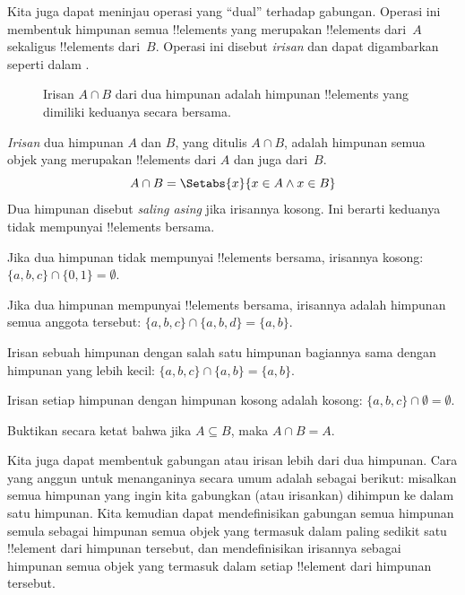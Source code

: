 \documentclass[../../../include/open-logic-section]{subfiles}
\begin{document}
\begin{explain}
Kita juga dapat meninjau operasi yang ``dual'' terhadap gabungan.
Operasi ini membentuk himpunan semua !!{element}s yang merupakan
!!{element}s dari~$A$ sekaligus !!{element}s dari~$B$. Operasi ini
disebut \emph{irisan} dan dapat digambarkan seperti dalam
.
\begin{figure}
  \caption{Irisan $A \cap B$ dari dua himpunan adalah himpunan
    !!{element}s yang dimiliki keduanya secara bersama.}
\end{figure}
\end{explain}

\begin{defn}[Irisan]
\emph{Irisan} dua himpunan $A$ dan $B$, yang ditulis $A \cap B$,
adalah himpunan semua objek yang merupakan !!{element}s dari $A$ dan
juga dari~$B$.
\[
A \cap B = \Setabs{x}{x \in A \land x \in B}
\]
Dua himpunan disebut \emph{saling asing} jika irisannya kosong. Ini
berarti keduanya tidak mempunyai !!{element}s bersama.
\end{defn}

\begin{ex}
Jika dua himpunan tidak mempunyai !!{element}s bersama, irisannya
kosong: $\{ a, b, c\} \cap \{ 0, 1\} = \emptyset$.

Jika dua himpunan mempunyai !!{element}s bersama, irisannya adalah
himpunan semua anggota tersebut: $\{a, b, c \} \cap \{a, b, d \} =
\{a, b\}$.

Irisan sebuah himpunan dengan salah satu himpunan bagiannya sama
dengan himpunan yang lebih kecil: $\{a, b, c\} \cap \{a, b\} =
\{a, b\}$.

Irisan setiap himpunan dengan himpunan kosong adalah kosong:
$\{a, b, c \} \cap \emptyset = \emptyset$.
\end{ex}

\begin{prob}
Buktikan secara ketat bahwa jika $A \subseteq B$, maka $A \cap B = A$.
\end{prob}

\begin{explain}
Kita juga dapat membentuk gabungan atau irisan lebih dari dua himpunan.
Cara yang anggun untuk menanganinya secara umum adalah sebagai berikut:
misalkan semua himpunan yang ingin kita gabungkan (atau irisankan)
dihimpun ke dalam satu himpunan. Kita kemudian dapat mendefinisikan
gabungan semua himpunan semula sebagai himpunan semua objek yang
termasuk dalam paling sedikit satu !!{element} dari himpunan tersebut,
dan mendefinisikan irisannya sebagai himpunan semua objek yang termasuk
dalam setiap !!{element} dari himpunan tersebut.
\end{explain}
\end{document}
